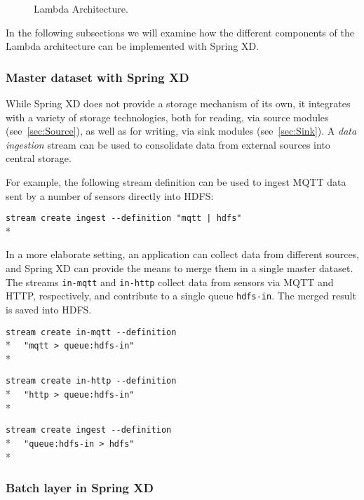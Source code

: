 \begin{figure}[ht]
\centering
{}
\caption{Lambda Architecture.}
\label{fig:lambda}
\end{figure}

In the following subsections we will examine how the different components
of the Lambda architecture can be implemented with Spring XD.

\subsubsection {Master dataset with Spring XD}

While Spring XD does not provide a storage mechanism of its own, it
integrates with a variety of storage technologies, both for reading,
via source modules (see~\ref{sec:Source}), as well as for writing, via
sink modules (see~\ref{sec:Sink}). A \emph{data ingestion}
stream can be used to consolidate data from external sources into
central storage.

For example, the following stream definition can be used to ingest 
MQTT\cite{mqtt} data sent by a number of sensors directly into HDFS:

\verb;stream create ingest --definition "mqtt | hdfs";\\*

In a more elaborate setting, an application can collect data from
different sources, and Spring XD can provide the means to merge them
in a single master dataset. The streams \texttt{in-mqtt} and \texttt{in-http}
collect data from sensors via MQTT and HTTP, respectively, and
contribute to a single queue \texttt{hdfs-in}. The merged result
is saved into HDFS.

\verb;stream create in-mqtt --definition ;\\*
\verb;  "mqtt > queue:hdfs-in";\\*

\verb;stream create in-http --definition  ;\\*
\verb;  "http > queue:hdfs-in";\\*

\verb;stream create ingest --definition  ;\\*
\verb;  "queue:hdfs-in > hdfs";\\*

\subsubsection {Batch layer in Spring XD}

